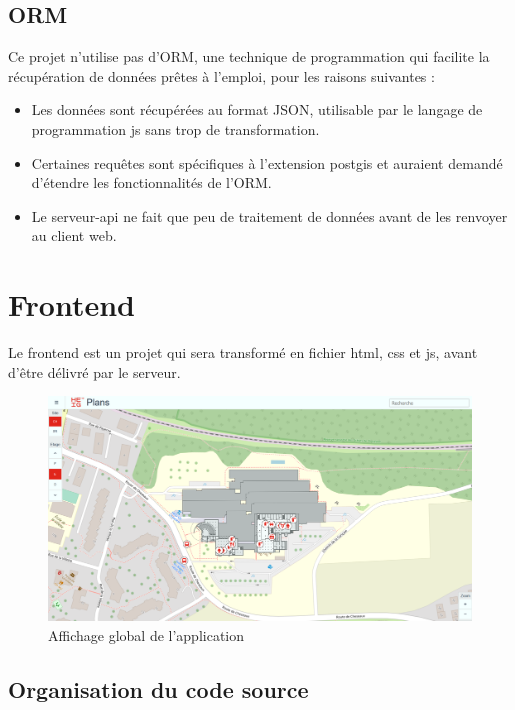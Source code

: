 \documentclass[
    iai, %
    il, %
]{heig-tb}
\begin{document}
\subsection{ORM}
Ce projet n'utilise pas d'ORM,
une technique de programmation qui facilite la récupération de données prêtes à l'emploi, pour les raisons suivantes :
\begin{itemize}
    \item Les données sont récupérées au format JSON, utilisable par le langage de programmation \gls{js} sans trop de transformation.
    \item Certaines requêtes sont spécifiques à l'extension \gls{postgis} et auraient demandé d'étendre les fonctionnalités de l'ORM.
    \item Le serveur-api ne fait que peu de traitement de données avant de les renvoyer au client web.
\end{itemize}



\section{Frontend}

Le frontend est un projet qui sera transformé en fichier \gls{html}, \gls{css} et \gls{js}, avant d'être délivré par le serveur.

\begin{figure}[h]
    \centering
    \includegraphics[scale=0.3]{frontend-global.png}
    \caption{Affichage global de l'application}
\end{figure}

\subsection{Organisation du code source}
\end{document}
